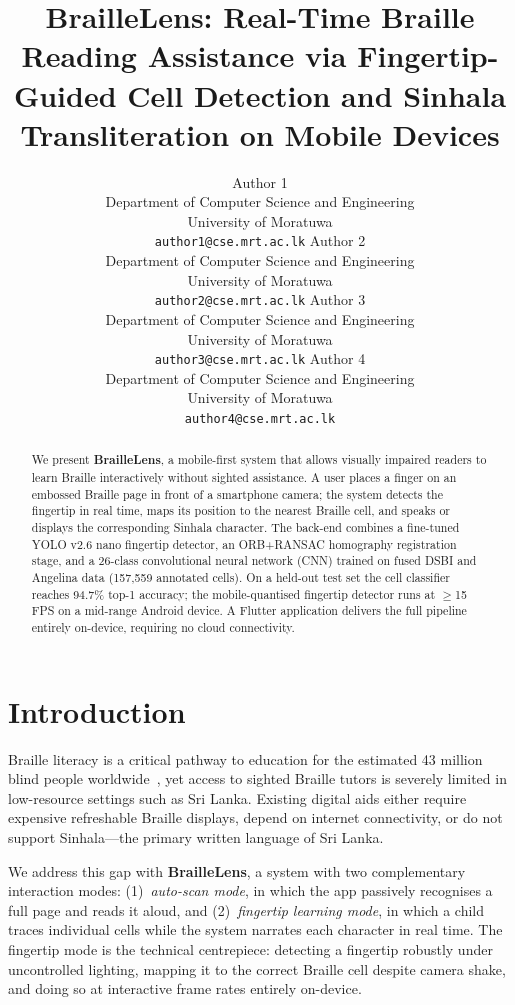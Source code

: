 \documentclass{article}
\title{BrailleLens: Real-Time Braille Reading Assistance via Fingertip-Guided
Cell Detection and Sinhala Transliteration on Mobile Devices}
\author{%
  Author 1 \\
  Department of Computer Science and Engineering\\
  University of Moratuwa\\
  \texttt{author1@cse.mrt.ac.lk}
  \And
  Author 2 \\
  Department of Computer Science and Engineering\\
  University of Moratuwa\\
  \texttt{author2@cse.mrt.ac.lk}
  \And
  Author 3 \\
  Department of Computer Science and Engineering\\
  University of Moratuwa\\
  \texttt{author3@cse.mrt.ac.lk}
  \And
  Author 4 \\
  Department of Computer Science and Engineering\\
  University of Moratuwa\\
  \texttt{author4@cse.mrt.ac.lk}
}
\begin{document}
\maketitle

\begin{abstract}
We present \textbf{BrailleLens}, a mobile-first system that allows visually
impaired readers to learn Braille interactively without sighted assistance.
A user places a finger on an embossed Braille page in front of a smartphone
camera; the system detects the fingertip in real time, maps its position to
the nearest Braille cell, and speaks or displays the corresponding Sinhala
character. The back-end combines a fine-tuned YOLO v2.6 nano fingertip
detector, an ORB+RANSAC homography registration stage, and a 26-class
convolutional neural network (CNN) trained on fused DSBI and Angelina data
(157,559 annotated cells). On a held-out test set the cell classifier
reaches 94.7\% top-1 accuracy; the mobile-quantised fingertip detector runs
at $\geq$15\,FPS on a mid-range Android device. A Flutter application
delivers the full pipeline entirely on-device, requiring no cloud
connectivity.
\end{abstract}

\section{Introduction}

Braille literacy is a critical pathway to education for the estimated 43
million blind people worldwide~\cite{who2023}, yet access to sighted Braille
tutors is severely limited in low-resource settings such as Sri Lanka.
Existing digital aids either require expensive refreshable Braille displays,
depend on internet connectivity, or do not support Sinhala—the primary
written language of Sri Lanka.

We address this gap with \textbf{BrailleLens}, a system with two
complementary interaction modes: (1)~\emph{auto-scan mode}, in which the
app passively recognises a full page and reads it aloud, and (2)~\emph{fingertip
learning mode}, in which a child traces individual cells while the system
narrates each character in real time.  The fingertip mode is the technical
centrepiece: detecting a fingertip robustly under uncontrolled lighting,
mapping it to the correct Braille cell despite camera shake, and doing so
at interactive frame rates entirely on-device.
\end{document}
